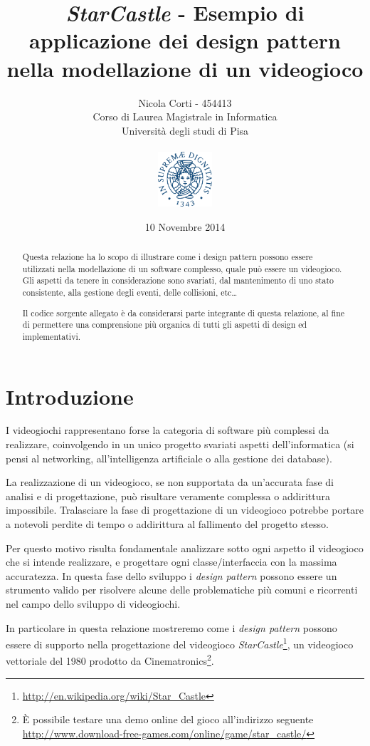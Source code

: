\documentclass[a4paper,12pt]{article}
\title{\emph{StarCastle} - Esempio di applicazione dei design pattern nella modellazione di un videogioco}
\author{Nicola Corti - 454413 \\Corso di Laurea Magistrale in Informatica \\ Universit\`a degli studi di Pisa \\ \\ \includegraphics[width=2cm]{unipi.pdf}}
\date{10 Novembre 2014}
\begin{document}
\maketitle

\begin{abstract}
Questa relazione ha lo scopo di illustrare come i design pattern possono essere utilizzati nella modellazione di un software complesso, quale pu\`o essere un videogioco. Gli aspetti da tenere in considerazione sono svariati, dal mantenimento di uno stato consistente, alla gestione degli eventi, delle collisioni, etc\dots{}

Il codice sorgente allegato \`e da considerarsi parte integrante di questa relazione, al fine di permettere una comprensione pi\`u organica di tutti gli aspetti di design ed implementativi.
\end{abstract}
\newpage

\tableofcontents
\newpage

\section*{Introduzione}
\label{sec:introduzione}

I videogiochi rappresentano forse la categoria di software pi\`u complessi da realizzare, coinvolgendo in un unico progetto svariati aspetti dell'informatica (si pensi al networking, all'intelligenza artificiale o alla gestione dei database).

La realizzazione di un videogioco, se non supportata da un'accurata fase di analisi e di progettazione, pu\`o risultare veramente complessa o addirittura impossibile. Tralasciare la fase di progettazione di un videogioco potrebbe portare a notevoli perdite di tempo o addirittura al fallimento del progetto stesso.

Per questo motivo risulta fondamentale analizzare sotto ogni aspetto il videogioco che si intende realizzare, e progettare ogni classe/interfaccia con la massima accuratezza. In questa fase dello sviluppo i \emph{design pattern} possono essere un strumento valido per risolvere alcune delle problematiche pi\`u comuni e ricorrenti nel campo dello sviluppo di videogiochi.

In particolare in questa relazione mostreremo come i \emph{design pattern} possono essere di supporto nella progettazione del videogioco \emph{StarCastle}\footnote{\url{http://en.wikipedia.org/wiki/Star_Castle}}, un videogioco vettoriale del 1980 prodotto da Cinematronics\footnote{\`E possibile testare una demo online del gioco all'indirizzo seguente \\ \url{http://www.download-free-games.com/online/game/star_castle/}}.
\end{document}
